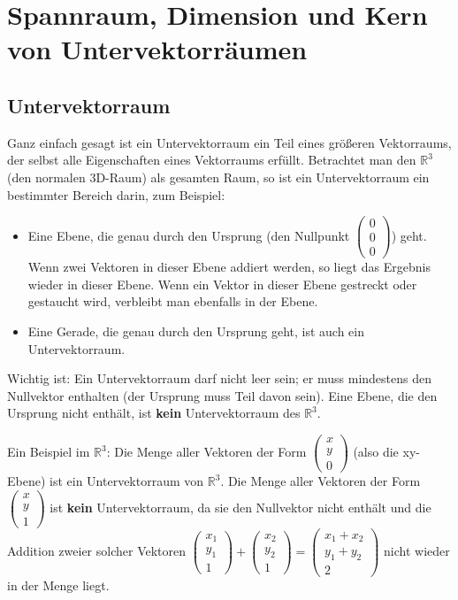\chapter{Spannraum, Dimension und Kern von Untervektorräumen}

\section{Untervektorraum}
Ganz einfach gesagt ist ein Untervektorraum ein Teil eines größeren
Vektorraums, der selbst alle Eigenschaften eines Vektorraums erfüllt.
Betrachtet man den \(\mathbb{R}^3\) (den normalen 3D-Raum) als gesamten Raum,
so ist ein Untervektorraum ein bestimmter Bereich darin, zum Beispiel:
\begin{itemize}
    \item Eine Ebene, die genau durch den Ursprung (den Nullpunkt \(\begin{pmatrix} 0 \\ 0 \\ 0 \end{pmatrix}\)) geht. Wenn zwei Vektoren in dieser Ebene addiert werden, so liegt das Ergebnis wieder in dieser Ebene. Wenn ein Vektor in dieser Ebene gestreckt oder gestaucht wird, verbleibt man ebenfalls in der Ebene.
    \item Eine Gerade, die genau durch den Ursprung geht, ist auch ein Untervektorraum.
\end{itemize}
Wichtig ist: Ein Untervektorraum darf nicht leer sein; er muss mindestens den Nullvektor enthalten (der Ursprung muss Teil davon sein). Eine Ebene, die den Ursprung nicht enthält, ist \textbf{kein} Untervektorraum des \(\mathbb{R}^3\).

Ein Beispiel im \(\mathbb{R}^3\): Die Menge aller Vektoren der Form \(\begin{pmatrix} x \\ y \\ 0 \end{pmatrix}\) (also die xy-Ebene) ist ein Untervektorraum von \(\mathbb{R}^3\).
Die Menge aller Vektoren der Form \(\begin{pmatrix} x \\ y \\ 1 \end{pmatrix}\) ist \textbf{kein} Untervektorraum, da sie den Nullvektor nicht enthält und die Addition zweier solcher Vektoren \(\begin{pmatrix} x_1 \\ y_1 \\ 1 \end{pmatrix} + \begin{pmatrix} x_2 \\ y_2 \\ 1 \end{pmatrix} = \begin{pmatrix} x_1+x_2 \\ y_1+y_2 \\ 2 \end{pmatrix}\) nicht wieder in der Menge liegt.


